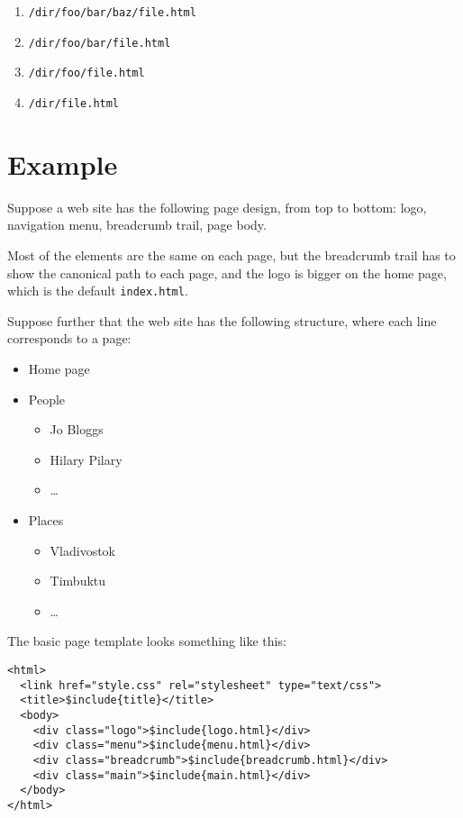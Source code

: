 \documentclass[english]{scrartcl}
\begin{document}
\begin{enumerate}
\item \verb|/dir/foo/bar/baz/file.html|
\item \verb|/dir/foo/bar/file.html|
\item \verb|/dir/foo/file.html|
\item \verb|/dir/file.html|
\end{enumerate}

\section{Example}

Suppose a web site has the following page design, from top to bottom: logo, navigation menu, breadcrumb trail, page body.

Most of the elements are the same on each page, but the breadcrumb trail has to show the canonical path to each page, and the logo is bigger on the home page, which is the default \verb|index.html|.

Suppose further that the web site has the following structure, where each line corresponds to a page:

\begin{itemize}
\item Home page
\item People
  \begin{itemize}
  \item Jo Bloggs
  \item Hilary Pilary
  \item \dots
  \end{itemize}
\item Places
  \begin{itemize}
  \item Vladivostok
  \item Timbuktu
  \item \dots
  \end{itemize}
\end{itemize}

The basic page template looks something like this:

\begin{verbatim}
<html>
  <link href="style.css" rel="stylesheet" type="text/css">
  <title>$include{title}</title>
  <body>
    <div class="logo">$include{logo.html}</div>
    <div class="menu">$include{menu.html}</div>
    <div class="breadcrumb">$include{breadcrumb.html}</div>
    <div class="main">$include{main.html}</div>
  </body>
</html>
\end{verbatim}
\end{document}
